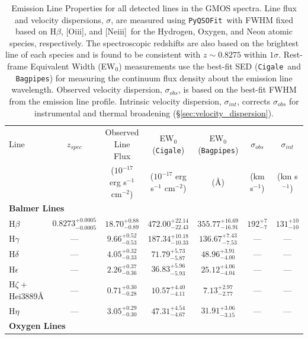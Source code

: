\documentclass[twocolumn,tight,times,linenumbers]{aastex631}
\newcommand{\hbeta}{H$\beta$}
\newcommand{\oiii}{[O{\sc iii}]}
\newcommand{\neiii}{[Ne{\sc iii}]}
\newcommand{\pyqsofit}{\texttt{PyQSOFit}}
\newcommand{\cigale}{\texttt{Cigale}}
\newcommand{\bagpipes}{\texttt{Bagpipes}}
\begin{document}
		\begin{table}
			\centering
			\caption{Emission Line Properties for all detected lines in the GMOS spectra. Line flux and velocity dispersions, $\sigma$, are measured using \pyqsofit~with FWHM fixed based on \hbeta, \oiii, and \neiii~for the Hydrogen, Oxygen, and Neon atomic species, respectively. The spectroscopic redshifts are also based on the brightest line of each species and is found to be consistent with $z \sim 0.8275$ within $1\sigma$. Rest-frame Equivalent Width (EW$_0$) measurements use the best-fit SED (\cigale~and \bagpipes) for measuring the continuum flux density about the emission line wavelength. Observed velocity dispersion, $\sigma_{obs}$, is based on the best-fit FWHM from the emission line profile. Intrinsic velocity dispersion, $\sigma_{int}$, corrects $\sigma_{obs}$ for instrumental and thermal broadening (\S\ref{sec:velocity_dispersion}).}
			\begin{tabular*}{\textwidth}{@{\extracolsep{\fill}}lcccccc}
				\hline
				Line & $z_{spec}$ & Observed Line Flux  & EW$_0$ (\verb|Cigale|)& EW$_0$ (\verb|Bagpipes|) & $ \sigma_{obs}$& $\sigma_{int}$\\
				&                     &  ($10^{-17}$ erg s$^{-1}$ cm$^{-2}$) & ($10^{-17}$ erg s$^{-1}$ cm$^{-2}$) & (\AA) & (km s$^{-1}$)  & (km s$^{-1}$) \\
				\hline
				\multicolumn{7}{l}{{\textbf{Balmer Lines}}}\\
				\hbeta & $0.8273^{+0.0005}_{-0.0005}$ & $18.70^{+0.88}_{-0.89}$ & $472.00^{+22.14}_{-22.43}$ & $355.77^{+16.69}_{-16.91}$ & $192^{+7}_{-7}$ & $131^{+10}_{-10}$ \\
				H$\gamma$ & --- & $9.66^{+0.52}_{-0.53}$ & $187.34^{+10.18}_{-10.33}$ & $136.67^{+7.43}_{-7.53}$ & --- & --- \\
				H$\delta$ & --- & $4.05^{+0.32}_{-0.33}$ & $71.79^{+5.73}_{-5.87}$ & $48.96^{+3.91}_{-4.00}$ & --- & --- \\
				H$\epsilon$ & --- & $2.26^{+0.37}_{-0.36}$ & $36.83^{+5.96}_{-5.93}$ & $25.12^{+4.06}_{-4.04}$ & --- & --- \\
				H$\zeta+$He{\sc i}3889\AA & --- & $0.71^{+0.30}_{-0.28}$ & $10.57^{+4.40}_{-4.11}$ & $7.13^{+2.97}_{-2.77}$ & --- & --- \\
				H$\eta$ & --- & $3.05^{+0.29}_{-0.30}$ & $47.31^{+4.54}_{-4.67}$ & $31.91^{+3.06}_{-3.15}$ & --- & --- \\
				\hline
				\multicolumn{7}{l}{{\textbf{Oxygen Lines}}}				\\    	    			    					

\end{tabular*}
\end{table}
\end{document}
